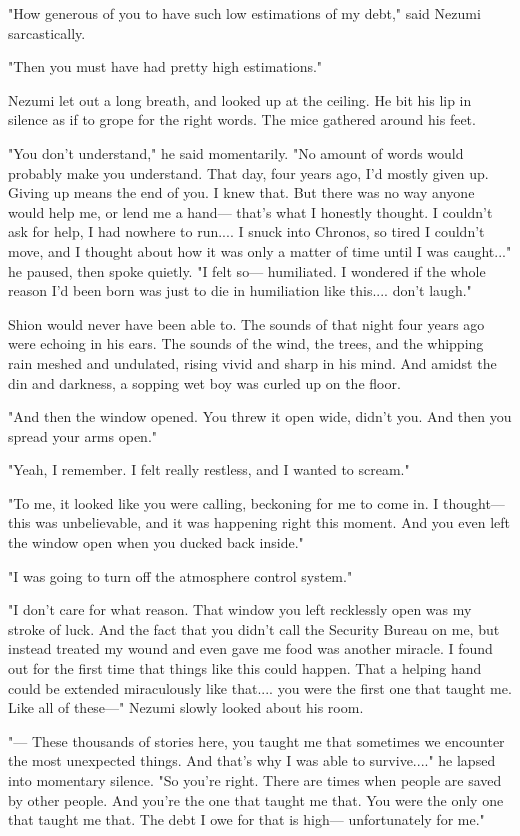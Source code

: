 "How generous of you to have such low estimations of my debt," said
Nezumi sarcastically.

"Then you must have had pretty high estimations."

Nezumi let out a long breath, and looked up at the ceiling. He bit his
lip in silence as if to grope for the right words. The mice gathered
around his feet.

"You don't understand," he said momentarily. "No amount of words would
probably make you understand. That day, four years ago, I'd mostly given
up. Giving up means the end of you. I knew that. But there was no way
anyone would help me, or lend me a hand--- that's what I honestly thought.
I couldn't ask for help, I had nowhere to run.... I snuck into Chronos,
so tired I couldn't move, and I thought about how it was only a matter
of time until I was caught..." he paused, then spoke quietly. "I felt
so--- humiliated. I wondered if the whole reason I'd been born was just to
die in humiliation like this.... don't laugh."

Shion would never have been able to. The sounds of that night four years
ago were echoing in his ears. The sounds of the wind, the trees, and the
whipping rain meshed and undulated, rising vivid and sharp in his mind.
And amidst the din and darkness, a sopping wet boy was curled up on the
floor.

"And then the window opened. You threw it open wide, didn't you. And
then you spread your arms open."

"Yeah, I remember. I felt really restless, and I wanted to scream."

"To me, it looked like you were calling, beckoning for me to come in. I
thought--- this was unbelievable, and it was happening right this moment.
And you even left the window open when you ducked back inside."

"I was going to turn off the atmosphere control system."

"I don't care for what reason. That window you left recklessly open was
my stroke of luck. And the fact that you didn't call the Security Bureau
on me, but instead treated my wound and even gave me food was another
miracle. I found out for the first time that things like this could
happen. That a helping hand could be extended miraculously like that....
you were the first one that taught me. Like all of these---" Nezumi slowly
looked about his room.

"--- These thousands of stories here, you taught me that sometimes we
encounter the most unexpected things. And that's why I was able to
survive...." he lapsed into momentary silence. "So you're right. There
are times when people are saved by other people. And you're the one that
taught me that. You were the only one that taught me that. The debt I
owe for that is high--- unfortunately for me."

